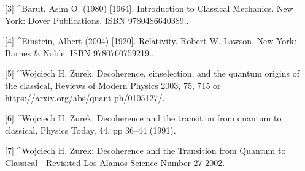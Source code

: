 [3]
^Barut, Asim O. (1980) [1964]. Introduction to Classical Mechanics. New York: Dover Publications. ISBN 9780486640389..

[4]
^Einstein, Albert (2004) [1920]. Relativity. Robert W. Lawson. New York: Barnes & Noble. ISBN 9780760759219..

[5]
^Wojciech H. Zurek, Decoherence, einselection, and the quantum origins of the classical, Reviews of Modern Physics 2003, 75, 715 or https://arxiv.org/abs/quant-ph/0105127/.

[6]
^Wojciech H. Zurek, Decoherence and the transition from quantum to classical, Physics Today, 44, pp 36–44 (1991).

[7]
^Wojciech H. Zurek: Decoherence and the Transition from Quantum to Classical—Revisited Los Alamos Science Number 27 2002.